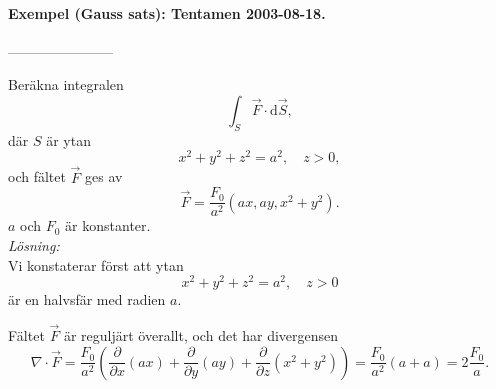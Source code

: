\documentclass[%
oneside,                 %
final,                   %
10pt]{article}
\begin{document}
\paragraph{Exempel (Gauss sats): Tentamen 2003-08-18.}
-----------------------

Beräkna integralen
\begin{equation}
  \int_S \vec{F}\cdot \mbox{d}\vec{S},
\end{equation}
där $S$ är ytan
\begin{equation}
  x^2 + y^2 + z^2 = a^2,  \quad z> 0,
\end{equation}
och fältet $\vec{F}$ ges av
\begin{equation}
  \vec{F} = \frac{F_0}{a^2} \left(ax, ay, x^2+y^2\right).
\end{equation}
$a$ och $F_0$ är konstanter.\\

\emph{Lösning:} \\
Vi konstaterar först att ytan
\begin{equation}
  x^2 + y^2 + z^2 = a^2, \quad z>0
\end{equation}
är en halvsfär med radien $a$.  

Fältet $\vec{F}$ är reguljärt överallt, och det har divergensen
\begin{equation}
  \nabla \cdot \vec{F} = \frac{F_0}{a^2}\left(\frac{\partial}{\partial x}
\left(ax\right) + \frac{\partial}{\partial y} \left(ay\right) +
\frac{\partial}{\partial z} \left(x^2 + y^2\right)\right) = \frac{F_0}{a^2}
\left(a+a\right) = 2 \frac{F_0}{a}.
\end{equation}
\end{document}

